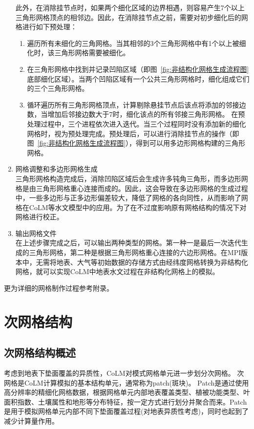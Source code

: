 \begin{enumerate}
此外，在消除挂节点时，如果两个细化区域的边界相遇，则容易产生7个以上三角形网格顶点的相邻边。因此，在消除挂节点之前，需要对初步细化后的网格进行如下预处理：
\begin{enumerate}
\item 遍历所有未细化的三角网格。当其相邻的3个三角形网格中有1个以上被细化时，该三角形网格需要被细化。
\item 在三角形网格中找到并记录凹陷区域（即图~\ref{fig:非结构化网格生成流程图} 底部细化区域）。当两个凹陷区域有一个公共三角形网格时，细化组成它们的三个三角形网格。
\item 循环遍历所有三角形网格顶点，计算剔除悬挂节点后该点将添加的邻接边数，当增加后邻接边数大于7时，细化该点的所有邻接三角形网格。
在预处理过程中，三个进程依次进入迭代。当三个过程同时没有添加新的细化网格时，视为预处理完成。预处理后，可以进行消除挂节点的操作（即图~\ref{fig:非结构化网格生成流程图}），得到可以用多边形网格构建的三角形网格。
\end{enumerate}
\item 网格调整和多边形网格生成\\
三角形网格构造完成后，消除凹陷区域后会生成许多钝角三角形，而多边形网格是由三角形网格重心连接而成的。因此，这会导致在多边形网格的生成过程中，一些多边形与正多边形偏差较大，降低了网格的各向同性，从而影响了网格在CoLM等水文模型中的应用。为了在不过度影响原有网格结构的情况下对网格进行校正。
\item 输出网格文件\\
在上述步骤完成之后，可以输出两种类型的网格。第一种一是最后一次迭代生成的三角形网格，第二种是根据三角形网格重心连接的六边形网格。在MPI版本中，无需将地表、大气等初始数据的存储方式由经纬度网格转换为非结构化网格，就可以实现CoLM中地表水文过程在非结构化网格上的模拟。
\end{enumerate}

更为详细的网格制作过程参考附录。


\section{次网格结构}\label{次网格}

\subsection{次网格结构概述}
考虑到地表下垫面覆盖的异质性，CoLM对模式网格单元进一步划分次网格。
次网格是CoLM计算模拟的基本结构单元，通常称为patch(斑块)。
Patch是通过使用高分辨率的精细化网格数据，根据网格单元内部地表覆盖类型、植被功能类型、叶面积指数、土壤属性和地形等分布特征，按一定方式进行划分并聚合而来。Patch是用于模拟网格单元内部不同下垫面覆盖过程(对地表异质性考虑)，同时也起到了减少计算量作用。


